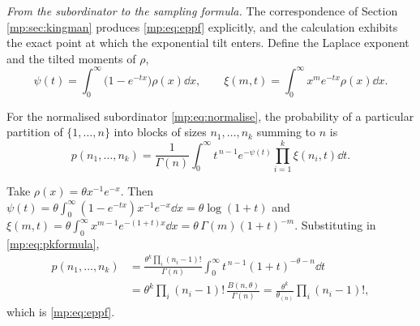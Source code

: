 \label{mp:sec:pk}

\medskip
\noindent\emph{From the subordinator to the sampling formula.} The correspondence of Section \ref{mp:sec:kingman} produces \eqref{mp:eq:eppf} explicitly, and the
calculation exhibits the exact point at which the exponential tilt enters. Define the Laplace exponent and the tilted moments of
$\rho$,
\[
\psi(t)=\int_0^\infty\big(1-e^{-tx}\big)\rho(x)\dd x,
\qquad
\xi(m,t)=\int_0^\infty x^m e^{-tx}\rho(x)\dd x .
\]

\begin{proposition}
\label{mp:prop:pk}
For the normalised subordinator \eqref{mp:eq:normalise}, the probability of a particular partition of $\{1,\dots,n\}$
into blocks of sizes $n_1,\dots,n_k$ summing to $n$ is
\begin{equation}
p(n_1,\dots,n_k)=\frac{1}{\Gamma(n)}\int_0^\infty t^{\,n-1}e^{-\psi(t)}
\prod_{i=1}^{k}\xi(n_i,t)\dd t .
\label{mp:eq:pkformula}
\end{equation}
\end{proposition}

\begin{example}
\label{mp:ex:gamma}
Take $\rho(x)=\theta x^{-1}e^{-x}$. Then
$\psi(t)=\theta\int_0^\infty(1-e^{-tx})x^{-1}e^{-x}\dd x=\theta\log(1+t)$ and
$\xi(m,t)=\theta\int_0^\infty x^{m-1}e^{-(1+t)x}\dd x=\theta\,\Gamma(m)(1+t)^{-m}$.
Substituting in \eqref{mp:eq:pkformula},
\[
\begin{aligned}
p(n_1,\dots,n_k)
&=\frac{\theta^{k}\prod_i(n_i-1)!}{\Gamma(n)}
\int_0^\infty t^{\,n-1}(1+t)^{-\theta-n}\dd t\\
&=\theta^{k}\prod_i(n_i-1)!\,\frac{B(n,\theta)}{\Gamma(n)}
=\frac{\theta^{k}}{\theta_{(n)}}\prod_i(n_i-1)! ,
\end{aligned}
\]
which is \eqref{mp:eq:eppf}.
\end{example}

